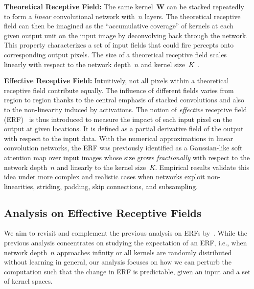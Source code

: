\documentclass{article} \usepackage{iclr2020_conference, times}
\def\mW{{\bm{W}}}
\newcommand{\bfsection}[1]{\noindent\textbf{#1:}}
\begin{document}
\bfsection{Theoretical Receptive Field}
The same kernel~$\mW$ can be stacked repeatedly to
form a \textit{linear} convolutional network with~$n$ layers.
The theoretical receptive field can then be imagined as the ``accumulative
coverage'' of kernels at each given output unit on the input image by
deconvolving back through the network.
This property characterizes a set of input fields that could fire
percepts onto corresponding output pixels.
The size of a theoretical receptive field scales linearly with respect to the
network depth~$n$ and kernel size~$K$~\citep{he2016deep}.

\bfsection{Effective Receptive Field}
Intuitively, not all pixels within a theoretical receptive field contribute
equally.
The influence of different fields varies from region to region
thanks to the central emphasis of stacked convolutions and also to the non-linearity induced
by activations.
The notion of \textit{effective} receptive field
(ERF)~\citep{luo2016understanding} is thus introduced to measure the
impact of each input pixel on the output at given locations.
It is defined as a partial derivative field of the output with respect to the input
data.
With the numerical approximations in linear convolution networks, the ERF was
previously identified as a Gaussian-like soft attention map over input images
whose size grows \textit{fractionally} with respect to the network depth~$n$ and linearly to the kernel size~$K$.
Empirical results validate this idea under more complex and
realistic cases when networks exploit non-linearities, striding, padding, skip
connections, and subsampling.


\subsection{Analysis on Effective Receptive Fields} \label{sec:analyzing}

We aim to revisit and complement the previous analysis on ERFs
by~\citet{luo2016understanding}.
While the previous analysis concentrates on studying the expectation of an ERF,
i.e., when network depth~$n$ approaches infinity or all kernels are randomly
distributed without learning in general, our analysis focuses on how we can
perturb the computation such that the change in ERF is predictable,
given an input and a set of kernel spaces.\
\end{document}
